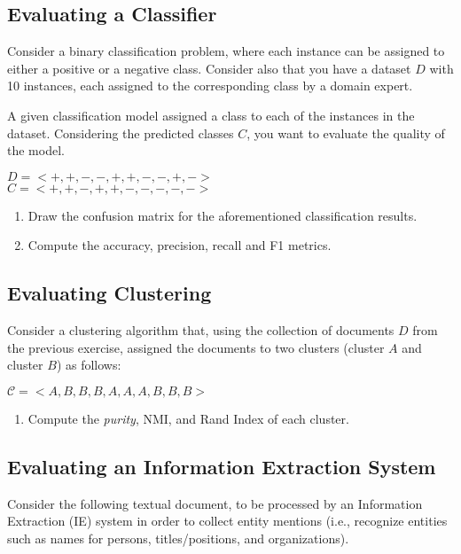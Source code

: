 \documentclass[12pt]{article}
\begin{document}
\subsection{Evaluating a Classifier}

Consider a binary classification problem, where each instance can be assigned to either a positive or a negative class. Consider also that you have a dataset $D$ with 10 instances, each assigned to the corresponding class by a domain expert. 

A given classification model assigned a class to each of the instances in the dataset. Considering the predicted classes $C$, you want to evaluate the quality of the model.

\begin{center}
$D = < + , + , - , - , + , + , - , - , + , - >$ \\
$C = < + , + , - , + , + , - , - , - , - , - >$
\end{center}

\begin{enumerate}
\item Draw the confusion matrix for the aforementioned classification results.
\item Compute the accuracy, precision, recall and F1 metrics.
\end{enumerate}

\subsection{Evaluating Clustering}

Consider a clustering algorithm that, using the collection of documents $D$ from the previous exercise, assigned the documents to two clusters (cluster $A$ and cluster $B$) as follows:

\begin{center}
    $\mathcal{C} = < A , B , B , B , A , A , A , B , B , B >$
\end{center}

\begin{enumerate}
\item Compute the \emph{purity}, NMI, and Rand Index of each cluster.
\end{enumerate}

\subsection{Evaluating an Information Extraction System}

Consider the following textual document, to be processed by an Information Extraction (IE) system in order to collect entity mentions (i.e., recognize entities such as names for persons, titles/positions, and organizations).
\end{document}
